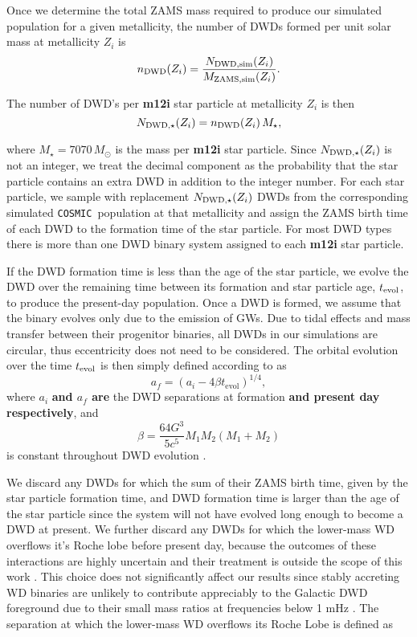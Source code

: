 \documentclass[twocolumn, linenumbers]{aastex631}
\newcommand{\cosmic}{\texttt{COSMIC}}
\begin{document}
Once we determine the total ZAMS mass required to produce our simulated population for a given metallicity, the number of DWDs formed per unit solar mass at metallicity $Z_i$ is
\begin{equation}
    n_{\rm{DWD}}(Z_i) = \frac{N_{\rm{DWD, sim}}(Z_i)}{M_{\rm{ZAMS, sim}}(Z_i)}.
\end{equation}

\noindent The number of DWD’s per \textbf{m12i} star particle at metallicity $Z_i$ is then
\begin{equation}
    N_{\rm{DWD},\star} (Z_i) = n_{\rm{DWD}}(Z_i)\, M_\star,
\end{equation}


\noindent where $M_\star = 7070\,M_\odot$ is the mass per \textbf{m12i} star particle. Since $N_{\rm{DWD},\star} (Z_i)$ is not an integer, we treat the decimal component as the probability that the star particle contains an extra DWD in addition to the integer number. For each star particle, we sample with replacement $N_{\rm{DWD},\star}(Z_i)$ DWDs from the corresponding simulated \cosmic\ population at that metallicity and assign the ZAMS birth time of each DWD to the formation time of the star particle. For most DWD types there is more than one DWD binary system assigned to each \textbf{m12i} star particle. 


If the DWD formation time is less than the age of the star particle, we evolve the DWD over the remaining time between its formation and star particle age, $t_{\rm{evol}}$, to produce the present-day population. Once a DWD is formed, we assume that the binary evolves only due to the emission of GWs. Due to tidal effects and mass transfer between their progenitor binaries, all DWDs in our simulations are circular, thus eccentricity does not need to be considered. The orbital evolution over the time $t_{\rm{evol}}$ is then simply defined according to \citet{Peters1964} as
\begin{equation}
    a_f = (a_i - 4\beta t_\text{evol})^{1/4},
\end{equation}
where $a_i$ \textbf{and $a_f$ are} the DWD separations at formation\textbf{ and present day respectively}, and 
\begin{equation}
    \beta = \frac{64G^3}{5c^5} M_1M_2(M_1+M_2)
\end{equation}
is constant throughout DWD evolution \citep{Peters1964}.

We discard any DWDs for which the sum of their ZAMS birth time, given by the star particle formation time, and DWD formation time is larger than the age of the star particle since the system will not have evolved long enough to become a DWD at present. We further discard any DWDs for which the lower-mass WD overflows it's Roche lobe before present day, because the outcomes of these interactions are highly uncertain and their treatment is outside the scope of this work \citep[e.g., ][]{Shen2015, Kremer2017}. This choice does not significantly affect our results since stably accreting WD binaries are unlikely to contribute appreciably to the Galactic DWD foreground due to their small mass ratios at frequencies below 1 mHz \citep{Breivik2018}. The separation at which the lower-mass WD overflows its Roche Lobe is defined as
\end{document}
